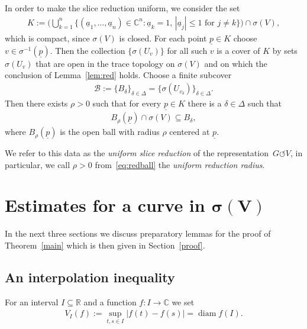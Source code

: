 \documentclass[pdftex]{sigma}
\numberwithin{equation}{section}
\def\de{\delta}
\def\rh{\rho}
\def\si{\sigma}
\def\De{\Delta}
\def\C{\mathbb{C}}
\def\R{\mathbb{R}}
\def\cB{\mathcal{B}}
\def\ul{\underline}
\def\acts{\circlearrowleft}
\let\on=\operatorname
\begin{document}
In order to make the slice reduction uniform, we consider
the set
\begin{gather} \label{eq:compactK}
 K:= \bigg(\bigcup_{k=1}^n \big\{(\ul a_1, \dots,\ul a_n) \in \C^{n} \colon \ul a_k=1,\,|\ul a_j| \le 1 \text{ for }j \ne k\big\}\bigg) \cap \si(V),
\end{gather}
which is compact, since $\si(V)$ is closed. For each point $\underline p \in K$ choose $v \in \si^{-1}(\underline p)$.
Then the collection $\{\si(U_v)\}$ for all such $v$ is a cover of $K$ by sets $\si(U_v)$ that are open in the
trace topology on $\si(V)$
and on which
the conclusion of Lemma~\ref{lem:red} holds.
Choose a finite subcover
\begin{gather*} %
 \cB := \{B_\de\}_{\de \in \De} = \{\si(U_{v_\de})\}_{\de \in \De}.
\end{gather*}
Then there exists $\rh>0$ such that for every $\underline p \in K$ there is a $\de \in \De$ such that
\begin{gather} \label{eq:redball}
 B_\rh(\underline p) \cap \si(V) \subseteq B_{\de},
\end{gather}
where $B_\rh(\underline p)$ is the open ball with radius $\rh$ centered at $\ul p$.

\begin{Definition}
We refer to this data as the \emph{uniform slice reduction} of the representation~$G \acts V$,
in particular, we call $\rh>0$ from~\eqref{eq:redball} the \emph{uniform reduction radius}.
\end{Definition}

\section[Estimates for a curve in sigma(V)]{Estimates for a curve in $\boldsymbol{\si(V)}$} \label{aestimates}

In the next three sections we discuss preparatory lemmas for the proof of Theorem~\ref{main} which is then
given in Section~\ref{proof}.

\subsection{An interpolation inequality}
For an interval $I \subseteq \R$ and a function $f \colon I \to \C$ we set
\begin{gather*}
 V_I(f) := \sup_{t,s \in I} |f(t)-f(s)| = \on{diam} f(I).
\end{gather*}
\end{document}
